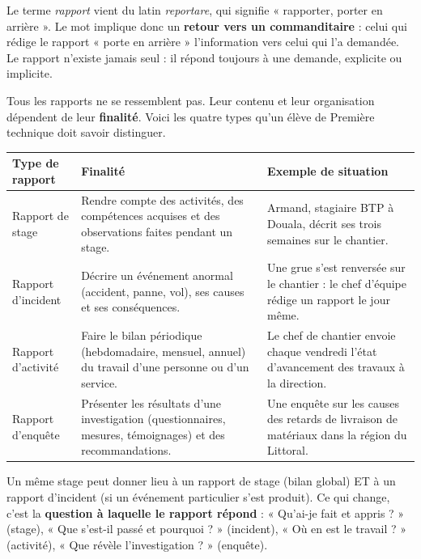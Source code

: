 \documentclass[11pt]{article}
\newcounter{popsec}
\newcounter{popsub}
\newcommand{\courssub}[1]{%
  \stepcounter{popsub}%
  \par\vspace{9pt}\noindent{\popxbold\fontsize{11.5}{13}\selectfont\color{popink}{\color{poporange}\thepopsec.\thepopsub}\hspace{6pt}#1}\par\nopagebreak\vspace{4pt}
}
\begin{document}
\begin{savaistu}
Le terme \emph{rapport} vient du latin \emph{reportare}, qui signifie « rapporter, porter en arrière ». Le mot implique donc un \textbf{retour vers un commanditaire} : celui qui rédige le rapport « porte en arrière » l'information vers celui qui l'a demandée. Le rapport n'existe jamais seul : il répond toujours à une demande, explicite ou implicite.
\end{savaistu}

\courssub{Les principaux types de rapports}

Tous les rapports ne se ressemblent pas. Leur contenu et leur organisation dépendent de leur \textbf{finalité}. Voici les quatre types qu'un élève de Première technique doit savoir distinguer.

\begin{center}
\begin{tabularx}{\linewidth}{|l|X|X|}
\hline
\rowcolor{popblueL} \textbf{Type de rapport} & \textbf{Finalité} & \textbf{Exemple de situation} \\
\hline
Rapport de stage & Rendre compte des activités, des compétences acquises et des observations faites pendant un stage. & Armand, stagiaire BTP à Douala, décrit ses trois semaines sur le chantier. \\
\hline
Rapport d'incident & Décrire un événement anormal (accident, panne, vol), ses causes et ses conséquences. & Une grue s'est renversée sur le chantier : le chef d'équipe rédige un rapport le jour même. \\
\hline
Rapport d'activité & Faire le bilan périodique (hebdomadaire, mensuel, annuel) du travail d'une personne ou d'un service. & Le chef de chantier envoie chaque vendredi l'état d'avancement des travaux à la direction. \\
\hline
Rapport d'enquête & Présenter les résultats d'une investigation (questionnaires, mesures, témoignages) et des recommandations. & Une enquête sur les causes des retards de livraison de matériaux dans la région du Littoral. \\
\hline
\end{tabularx}
\end{center}

\begin{attention}
Un même stage peut donner lieu à un rapport de stage (bilan global) ET à un rapport d'incident (si un événement particulier s'est produit). Ce qui change, c'est la \textbf{question à laquelle le rapport répond} : « Qu'ai-je fait et appris ? » (stage), « Que s'est-il passé et pourquoi ? » (incident), « Où en est le travail ? » (activité), « Que révèle l'investigation ? » (enquête).
\end{attention}
\end{document}
